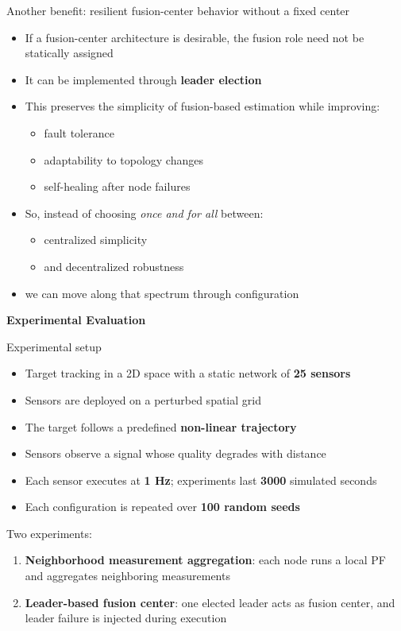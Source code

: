 \documentclass[aspectratio=169]{beamer}
\begin{document}
\begin{frame}{Another benefit: resilient fusion-center behavior without a fixed center}
\begin{itemize}
    \item If a fusion-center architecture is desirable, the fusion role need not be statically assigned
    \item It can be implemented through \textbf{leader election}
    \item This preserves the simplicity of fusion-based estimation while improving:
    \begin{itemize}
        \item fault tolerance
        \item adaptability to topology changes
        \item self-healing after node failures
    \end{itemize}
    \item So, instead of choosing \emph{once and for all} between:
    \begin{itemize}
        \item centralized simplicity
        \item and decentralized robustness
    \end{itemize}
    \item we can move along that spectrum through configuration
\end{itemize}
\end{frame}

\begin{frame}[standout]
	\Huge\textbf{Experimental Evaluation}
\end{frame}

\begin{frame}{Experimental setup}
\begin{itemize}
    \item Target tracking in a 2D space with a static network of \textbf{25 sensors}
    \item Sensors are deployed on a perturbed spatial grid
    \item The target follows a predefined \textbf{non-linear trajectory}
    \item Sensors observe a signal whose quality degrades with distance
    \item Each sensor executes at \textbf{1 Hz}; experiments last \textbf{3000} simulated seconds
    \item Each configuration is repeated over \textbf{100 random seeds}
\end{itemize}

\vspace{0.5em}
Two experiments:
\begin{enumerate}
    \item \textbf{Neighborhood measurement aggregation}: each node runs a local PF and aggregates neighboring measurements
    \item \textbf{Leader-based fusion center}: one elected leader acts as fusion center, and leader failure is injected during execution
\end{enumerate}
\end{frame}
\end{document}
